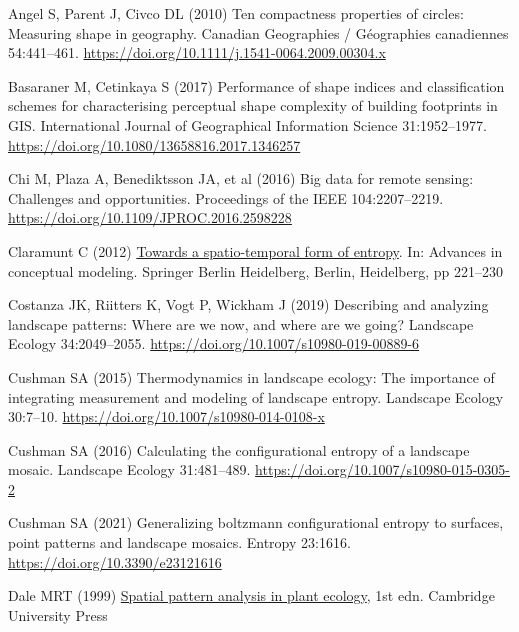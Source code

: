 \documentclass[
  12pt,
  a4paperpaper,
]{article}
\newlength{\cslhangindent}
\newenvironment{CSLReferences}[2] %
 {\begin{list}{}{%
  \setlength{\itemindent}{0pt}
  \setlength{\leftmargin}{0pt}
  \setlength{\parsep}{0pt}
  \ifodd #1
   \setlength{\leftmargin}{\cslhangindent}
   \setlength{\itemindent}{-1\cslhangindent}
  \fi
  \setlength{\itemsep}{#2\baselineskip}}}
 {\end{list}}
\begin{document}
\label{refs}
\begin{CSLReferences}{1}{1}
Angel S, Parent J, Civco DL (2010) Ten compactness properties of
circles: Measuring shape in geography. Canadian Geographies /
G{é}ographies canadiennes 54:441--461.
\url{https://doi.org/10.1111/j.1541-0064.2009.00304.x}

Basaraner M, Cetinkaya S (2017) Performance of shape indices and
classification schemes for characterising perceptual shape complexity of
building footprints in GIS. International Journal of Geographical
Information Science 31:1952--1977.
\url{https://doi.org/10.1080/13658816.2017.1346257}

Chi M, Plaza A, Benediktsson JA, et al (2016) Big data for remote
sensing: Challenges and opportunities. Proceedings of the IEEE
104:2207--2219. \url{https://doi.org/10.1109/JPROC.2016.2598228}

Claramunt C (2012)
\href{https://doi.org/10.1007/978-3-642-33999-8_28}{Towards a
spatio-temporal form of entropy}. In: Advances in conceptual modeling.
Springer Berlin Heidelberg, Berlin, Heidelberg, pp 221--230

Costanza JK, Riitters K, Vogt P, Wickham J (2019) Describing and
analyzing landscape patterns: Where are we now, and where are we going?
Landscape Ecology 34:2049--2055.
\url{https://doi.org/10.1007/s10980-019-00889-6}

Cushman SA (2015) Thermodynamics in landscape ecology: The importance of
integrating measurement and modeling of landscape entropy. Landscape
Ecology 30:7--10. \url{https://doi.org/10.1007/s10980-014-0108-x}

Cushman SA (2016) Calculating the configurational entropy of a landscape
mosaic. Landscape Ecology 31:481--489.
\url{https://doi.org/10.1007/s10980-015-0305-2}

Cushman SA (2021) Generalizing boltzmann configurational entropy to
surfaces, point patterns and landscape mosaics. Entropy 23:1616.
\url{https://doi.org/10.3390/e23121616}

Dale MRT (1999) \href{https://doi.org/10.1017/CBO9780511612589}{Spatial
pattern analysis in plant ecology}, 1st edn. Cambridge University Press


\end{CSLReferences}
\end{document}
